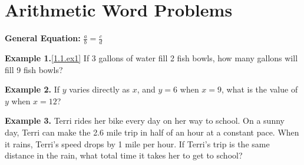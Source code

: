 \section{Arithmetic Word Problems}

\bigskip
\textbf{General Equation:} $\frac{a}{b}=\frac{c}{d}$

\vfill
\textbf{Example 1.}\ref{1.1.ex1} If 3 gallons of water fill 2 fish bowls, how many gallons will fill 9 fish bowls?

\vfill
\textbf{Example 2.} If $y$ varies directly as $x$, and $y=6$ when $x=9$, what is the value of $y$ when $x=12$?

\vfill
\textbf{Example 3.} Terri rides her bike every day on her way to school. On a sunny day, Terri can make the 2.6 mile trip in half of an hour at a constant pace. When it rains, Terri's speed drops by 1 mile per hour. If Terri's trip is the same distance in the rain, what total time it takes her to get to school?

\vfill
\newpage
\setlength{\columnseprule}{1pt}

